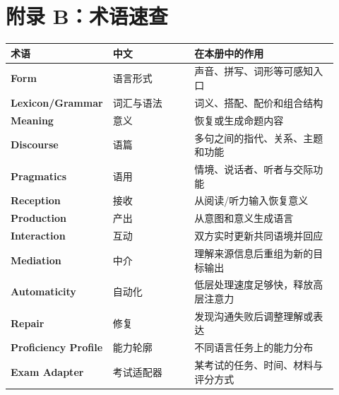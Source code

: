 \documentclass[11pt,a4paper]{ctexart}
\begin{document}
\section{附录 B：术语速查}
\small
\begin{longtable}{>{\bfseries}p{0.23\linewidth} p{0.25\linewidth} p{0.44\linewidth}}
\toprule
术语 & 中文 & 在本册中的作用 \\
\midrule
Form & 语言形式 & 声音、拼写、词形等可感知入口 \\
Lexicon/Grammar & 词汇与语法 & 词义、搭配、配价和组合结构 \\
Meaning & 意义 & 恢复或生成命题内容 \\
Discourse & 语篇 & 多句之间的指代、关系、主题和功能 \\
Pragmatics & 语用 & 情境、说话者、听者与交际功能 \\
Reception & 接收 & 从阅读/听力输入恢复意义 \\
Production & 产出 & 从意图和意义生成语言 \\
Interaction & 互动 & 双方实时更新共同语境并回应 \\
Mediation & 中介 & 理解来源信息后重组为新的目标输出 \\
Automaticity & 自动化 & 低层处理速度足够快，释放高层注意力 \\
Repair & 修复 & 发现沟通失败后调整理解或表达 \\
Proficiency Profile & 能力轮廓 & 不同语言任务上的能力分布 \\
Exam Adapter & 考试适配器 & 某考试的任务、时间、材料与评分方式 \\
\bottomrule
\end{longtable}
\normalsize
\end{document}
